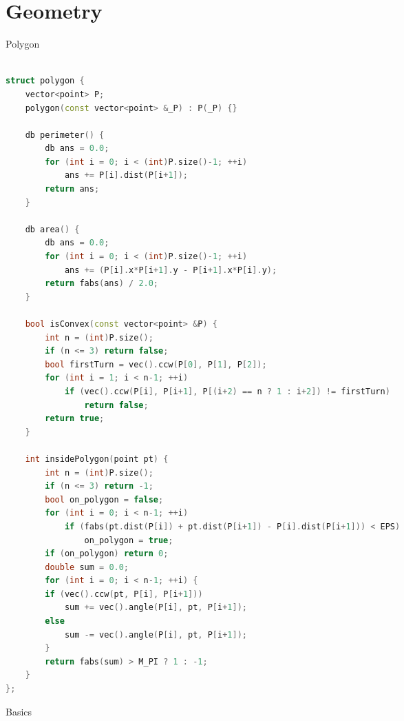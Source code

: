 \documentclass[leter]{amsart}
\begin{document}
\section{Geometry}
Polygon
\begin{multicols}{2}
\begin{lstlisting}[language=C++]

struct polygon {
    vector<point> P;
    polygon(const vector<point> &_P) : P(_P) {}

    db perimeter() {
        db ans = 0.0;
        for (int i = 0; i < (int)P.size()-1; ++i)
            ans += P[i].dist(P[i+1]);
        return ans;
    }

    db area() {
        db ans = 0.0;
        for (int i = 0; i < (int)P.size()-1; ++i)
            ans += (P[i].x*P[i+1].y - P[i+1].x*P[i].y);
        return fabs(ans) / 2.0;
    }

    bool isConvex(const vector<point> &P) {
        int n = (int)P.size();
        if (n <= 3) return false;
        bool firstTurn = vec().ccw(P[0], P[1], P[2]);
        for (int i = 1; i < n-1; ++i)
            if (vec().ccw(P[i], P[i+1], P[(i+2) == n ? 1 : i+2]) != firstTurn)
                return false;
        return true; 
    }

    int insidePolygon(point pt) {
        int n = (int)P.size();
        if (n <= 3) return -1;
        bool on_polygon = false;
        for (int i = 0; i < n-1; ++i)
            if (fabs(pt.dist(P[i]) + pt.dist(P[i+1]) - P[i].dist(P[i+1])) < EPS)
                on_polygon = true;
        if (on_polygon) return 0;
        double sum = 0.0;
        for (int i = 0; i < n-1; ++i) {
        if (vec().ccw(pt, P[i], P[i+1]))
            sum += vec().angle(P[i], pt, P[i+1]);
        else
            sum -= vec().angle(P[i], pt, P[i+1]);
        }
        return fabs(sum) > M_PI ? 1 : -1;
    }
};


\end{lstlisting}
\end{multicols}
Basics
\end{document}
